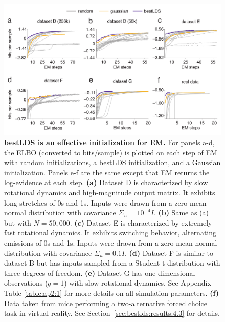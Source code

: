 \begin{figure}[t!]
\centering
\includegraphics[width=0.90\linewidth]{ch4-bestlds/bestlds-figures/fig3.pdf}
\caption{\textbf{bestLDS is an effective initialization for EM.} For panels a-d, the ELBO (converted to bits/sample) is plotted on each step of EM with random initializations, a bestLDS initialization, and a Gaussian initialization. Panels e-f are the same except that EM returns the log-evidence at each step. \textbf{(a)} Dataset D is characterized by slow rotational dynamics and high-magnitude output matrix. It exhibits long stretches of 0s and 1s. Inputs were drawn from a zero-mean normal distribution with covariance $\Sigma_u = 10^{-4}I$. \textbf{(b)} Same as (a) but with $N=50,000$. \textbf{(c)} Dataset E is characterized by extremely fast rotational dynamics. It exhibits switching behavior, alternating emissions of 0s and 1s. Inputs were drawn from a zero-mean normal distribution with covariance $\Sigma_u = 0.1I$. \textbf{(d)} Dataset F is similar to dataset B but has inputs sampled from a Student-t distribution with three degrees of freedom. \textbf{(e)} Dataset G has one-dimensional observations ($q=1$) with slow rotational dynamics. See Appendix Table \ref{table:ap2:1} for more details on all simulation parameters. \textbf{(f)} Data taken from mice performing a two-alternative forced choice task in virtual reality. See Section~\ref{sec:bestlds:results:4.3} for details. }
\label{fig:bestlds:3}
\end{figure}

